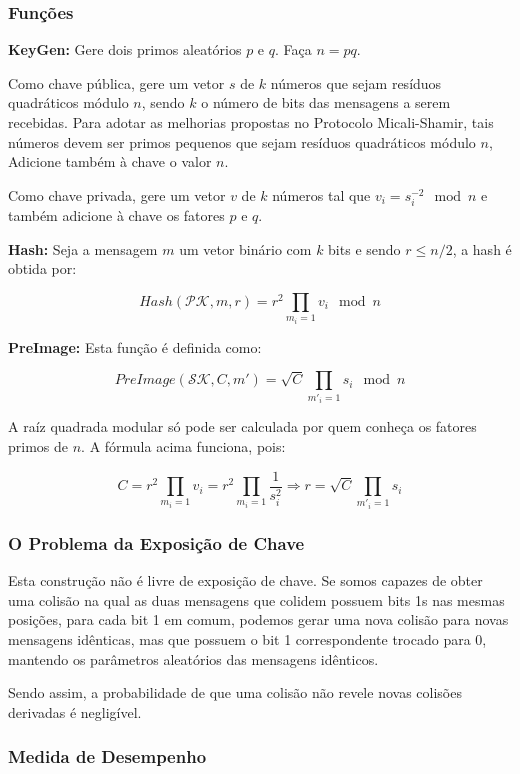 \documentclass[a4paper]{article}
\begin{document}
\subsubsection{Funções}

\textbf{KeyGen: } Gere dois primos aleatórios $p$ e $q$. Faça $n=pq$.

Como chave pública, gere um vetor $s$ de $k$ números que sejam
resíduos quadráticos módulo $n$, sendo $k$ o número de bits das
mensagens a serem recebidas. Para adotar as melhorias propostas no
Protocolo Micali-Shamir, tais números devem ser primos pequenos que
sejam resíduos quadráticos módulo $n$, Adicione também à chave o valor
$n$.

Como chave privada, gere um vetor $v$ de $k$ números tal que
$v_i=s_i^{-2} \mod n$ e também adicione à chave os fatores $p$ e $q$.

\textbf{Hash: } Seja a mensagem $m$ um vetor binário com $k$ bits e
sendo $r \leq n/2$, a hash é obtida por:

$$ Hash(\mathcal{PK}, m, r) = r^2\prod_{m_i=1}v_i \mod n
$$

\textbf{PreImage: } Esta função é definida como:

$$
PreImage(\mathcal{SK}, C, m') = \sqrt{C}\prod_{m'_i=1}s_i \mod n
$$

A raíz quadrada modular só pode ser calculada por quem conheça os
fatores primos de $n$. A fórmula acima funciona, pois:

$$ C = r^2\prod_{m_i=1}v_i =
r^2\prod_{m_i=1}\frac{1}{s_i^2}\Longrightarrow r=\sqrt{C}\prod_{m'_i=1}s_i
$$

\subsubsection{O Problema da Exposição de Chave}

Esta construção não é livre de exposição de chave. Se somos capazes de
obter uma colisão na qual as duas mensagens que colidem possuem bits
1s nas mesmas posições, para cada bit 1 em comum, podemos gerar uma
nova colisão para novas mensagens idênticas, mas que possuem o bit 1
correspondente trocado para 0, mantendo os parâmetros aleatórios das
mensagens idênticos.

Sendo assim, a probabilidade de que uma colisão não revele novas
colisões derivadas é negligível.

\subsubsection{Medida de Desempenho}
\end{document}
